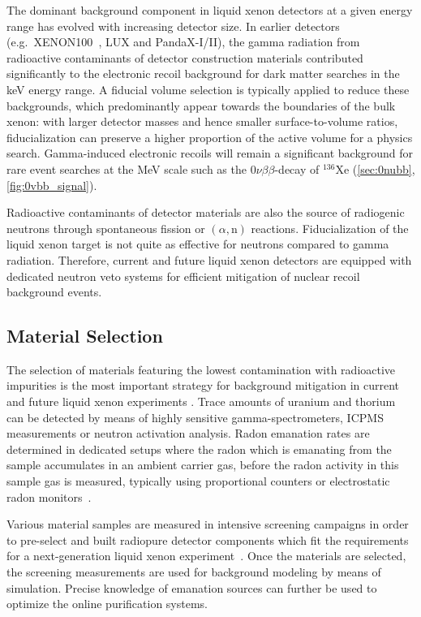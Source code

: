 The dominant background component in liquid xenon detectors at a given energy range has evolved with increasing detector size. In earlier detectors (e.g.~XENON100~\cite{Aprile:2011vb}, LUX and PandaX-I/II), the gamma radiation from radioactive contaminants of detector construction materials contributed significantly to the electronic recoil background for dark matter searches in the keV energy range. A fiducial volume selection is typically applied to reduce these backgrounds, which predominantly appear towards the boundaries of the bulk xenon: with larger detector masses and hence smaller surface-to-volume ratios, fiducialization can preserve a higher proportion of the active volume for a physics search. Gamma-induced electronic recoils will remain a significant background for rare event searches at the MeV scale such as the $0\nu \beta \beta$-decay of $^{136}$Xe (\autoref{sec:0nubb}, \autoref{fig:0vbb_signal}).

Radioactive contaminants of detector materials are also the source of radiogenic neutrons through spontaneous fission or $(\alpha,\mathrm{n})$ reactions. Fiducialization of the liquid xenon target is not quite as effective for neutrons compared to gamma radiation. Therefore, current and future liquid xenon detectors are equipped with dedicated neutron veto systems for efficient mitigation of nuclear recoil background events.

\subsection{Material Selection}

The selection of materials featuring the lowest contamination with radioactive impurities is the most important strategy for background mitigation in current and future liquid xenon experiments \cite{Aprile:2017ilq,Akerib:2020com}. Trace amounts of uranium and thorium can be detected by means of highly sensitive gamma-spectrometers, ICPMS measurements or neutron activation analysis. Radon emanation rates are determined in dedicated setups where the radon which is emanating from the sample accumulates in an ambient carrier gas, before the radon activity in this sample gas is measured, typically using proportional counters or electrostatic radon monitors~\cite{Akerib:2020com,Aprile:2020vmn}. 

Various material samples are measured in intensive screening campaigns in order to pre-select and built radiopure detector components which fit the requirements for a next-generation liquid xenon experiment~\cite{XENON:2015ara}. Once the materials are selected, the screening measurements are used for background modeling by means of simulation. Precise knowledge of emanation sources can further be used to optimize the online purification systems.

